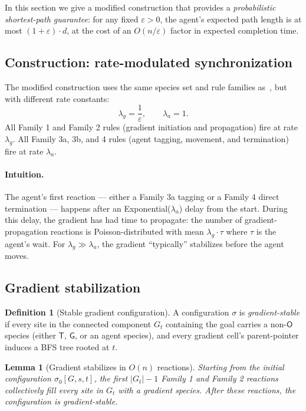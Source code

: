 \documentclass[11pt]{article}
\theoremstyle{plain}
\newtheorem{lemma}[theorem]{Lemma}
\theoremstyle{definition}
\newtheorem{definition}[theorem]{Definition}
\theoremstyle{remark}
\begin{document}
In this section we give a modified construction that provides a \emph{probabilistic shortest-path guarantee}: for any fixed $\varepsilon > 0$, the agent's expected path length is at most $(1+\varepsilon) \cdot d$, at the cost of an $O(n/\varepsilon)$ factor in expected completion time.

\subsection{Construction: rate-modulated synchronization}
\label{subsec:shortest-construction}

The modified construction uses the same species set and rule families as~, but with different rate constants:
\[
\lambda_g = \frac{1}{\varepsilon}, \qquad \lambda_a = 1.
\]
All Family 1 and Family 2 rules (gradient initiation and propagation) fire at rate $\lambda_g$. All Family 3a, 3b, and 4 rules (agent tagging, movement, and termination) fire at rate $\lambda_a$.

\paragraph{Intuition.} The agent's first reaction — either a Family 3a tagging or a Family 4 direct termination — happens after an Exponential($\lambda_a$) delay from the start. During this delay, the gradient has had time to propagate: the number of gradient-propagation reactions is Poisson-distributed with mean $\lambda_g \cdot \tau$ where $\tau$ is the agent's wait. For $\lambda_g \gg \lambda_a$, the gradient ``typically'' stabilizes before the agent moves.

\subsection{Gradient stabilization}

\begin{definition}[Stable gradient configuration]
\label{def:stable-gradient}
A configuration $\sigma$ is \emph{gradient-stable} if every site in the connected component $G_t$ containing the goal carries a non-$\mathsf{O}$ species (either $\mathsf{T}$, $\mathsf{G}$, or an agent species), and every gradient cell's parent-pointer induces a BFS tree rooted at $t$.
\end{definition}

\begin{lemma}[Gradient stabilizes in $O(n)$ reactions]
\label{lem:stabilization-reactions}
Starting from the initial configuration $\sigma_0[G, s, t]$, the first $|G_t| - 1$ Family 1 and Family 2 reactions collectively fill every site in $G_t$ with a gradient species. After these reactions, the configuration is gradient-stable.
\end{lemma}
\end{document}
